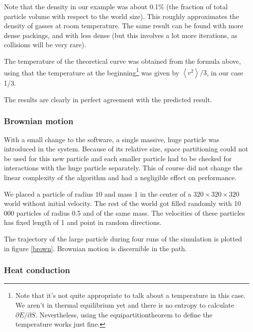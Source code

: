 Note that the density in our example was about 0.1\% (the fraction of total 
particle volume with respect to the world size). This roughly approximates 
the density of gasses at room temperature. The same result can be found 
with more dense packings, and with less dense (but this involves a lot more 
iterations, as collisions will be very rare).

The temperature of the theoretical curve was obtained from the formula 
above, using that the temperature at the beginning\footnote{Note that it's 
not quite appropriate to talk about a temperature in this case. We aren't 
in thermal equilibrium yet and there is no entropy to calculate $\partial E 
/ \partial S$. Nevertheless, using the equipartitiontheorem to define the 
temperature works just fine.}
was given by $\left<v^2\right>/3$, in our case 1/3.

The results are clearly in perfect agreement with the predicted result.


\subsubsection{Brownian motion}
With a small change to the software, a single massive, huge particle was 
introduced in the system. Because of its relative size, space partitioning 
could not be used for this new particle and each smaller particle had to be 
checked for interactions with the huge particle separately. This of course 
did not change the linear complexity of the algorithm and had a negligible 
effect on performance.

We placed a particle of radius $10$ and mass 1 in the center of a $320 
\times 320 \times 320$ world without initial velocity. The rest of the 
world got filled randomly with 10\,000 particles of radius 0.5 and of the 
same mass. The velocities of these particles has fixed length of 1 and
point in random directions.

The trajectory of the large particle during four runs of the simulation is 
plotted in figure \ref{brown}. Brownian motion is discernible in the path.



\subsubsection{Heat conduction}

